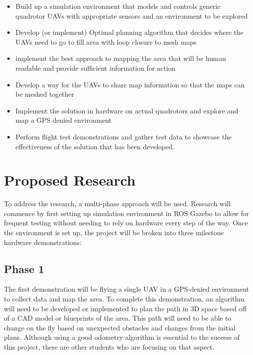 \documentclass[12pt, letterpaper]{article}
\begin{document}
\begin{itemize}

	\item Build up a simulation environment that models and controls generic quadrotor UAVs with appropriate sensors and an environment to be explored

	\item Develop (or implement) Optimal planning algorithm that decides where the UAVs need to go to fill area with loop closure to mesh maps  

	\item implement the best approach to mapping the area that will be human readable and provide sufficient information for action
	
	\item Develop a way for the UAVs to share map information so that the maps can be meshed together 

	\item Implement the solution in hardware on actual quadrotors and explore and map a GPS denied environment
	
	\item Perform flight test demonstrations and gather test data to showcase the effectiveness of the solution that has been developed.

\end{itemize}

\section{Proposed Research}

To address the research, a multi-phase approach will be used. Research will commence by first setting up simulation environment in ROS Gazebo to allow for frequent testing without needing to rely on hardware every step of the way. Once the environment is set up, the project will be broken into three milestone hardware demonstrations: 

\subsection{Phase 1}
The first demonstration will be flying a single UAV in a GPS-denied environment to collect data and map the area. To complete this demonstration, an algorithm will need to be developed or implemented to plan the path in 3D space based off of a CAD model or blueprints of the area. This path will need to be able to change on the fly based on unexpected obstacles and changes from the initial plans. Although using a good odometry algorithm is essential to the success of this project, there are other students who are focusing on that aspect. 
\end{document}

